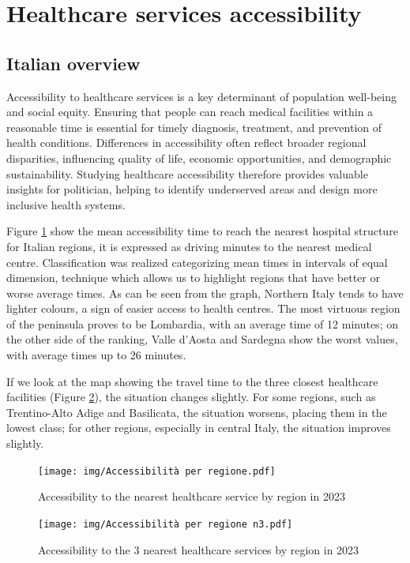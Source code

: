 \section{Healthcare services accessibility}

\subsection{Italian overview}

Accessibility to healthcare services is a key determinant of population well-being and social equity. 
Ensuring that people can reach medical facilities within a reasonable time is essential for timely diagnosis, treatment, and prevention of health conditions. 
Differences in accessibility often reflect broader regional disparities, influencing quality of life, economic opportunities, and demographic sustainability. 
Studying healthcare accessibility therefore provides valuable insights for politician, helping to identify underserved areas and design more inclusive health systems.

Figure \ref{map:acc_by_region_2023n1} show the mean accessibility time to reach the nearest hospital structure for Italian regions, it is expressed as driving minutes to the nearest medical centre.
Classification was realized categorizing mean times in intervals of equal dimension, technique which allows us to highlight regions that have better or worse average times.
As can be seen from the graph, Northern Italy tends to have lighter colours, a sign of easier access to health centres.
The most virtuous region of the peninsula proves to be Lombardia, with an average time of 12 minutes; on the other side of the ranking, Valle d'Aosta and Sardegna show the worst values, with average times up to 26 minutes.

If we look at the map showing the travel time to the three closest healthcare facilities (Figure \ref{map:acc_by_region_2023n3}), the situation changes slightly. 
For some regions, such as Trentino-Alto Adige and Basilicata, the situation worsens, placing them in the lowest class; for other regions, especially in central Italy, the situation improves slightly.


\begin{figure}[tbp]
	\centering
	\texttt{[image: img/Accessibilità per regione.pdf]}
	\caption{Accessibility to the nearest healthcare service by region in 2023}
	\label{map:acc_by_region_2023n1}
\end{figure}

\begin{figure}[tbp]
	\centering
	\texttt{[image: img/Accessibilità per regione n3.pdf]}
	\caption{Accessibility to the 3 nearest healthcare services by region in 2023}
	\label{map:acc_by_region_2023n3}
\end{figure}


